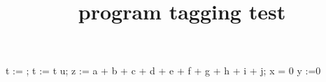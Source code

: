 \documentclass{article}
\title{program tagging test}
\begin{document}
\begin{program}
t := ;
t := t \setminus u;
z := a \tab {} + b + c + d
	    {} + e + f + g
	    {} + h + i + j; \untab
\IF x = 0 \THEN y :=0 \FI
\end{program}
\end{document}
